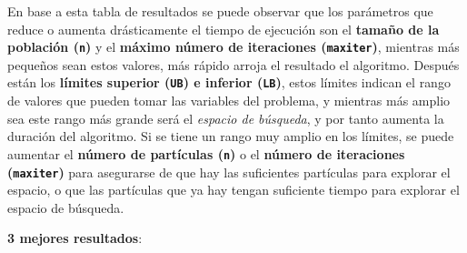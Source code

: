 \documentclass[12pt, a4paper]{article}
\begin{document}
        En base a esta tabla de resultados se puede observar que los parámetros que reduce o aumenta drásticamente el tiempo de ejecución son el \textbf{tamaño de la población (\lstinline{n})} y el \textbf{máximo número de iteraciones (\lstinline{maxiter})}, mientras más pequeños sean estos valores, más rápido arroja el resultado el algoritmo. Después están los \textbf{límites superior (\lstinline{UB}) e inferior (\lstinline{LB})}, estos límites indican el rango de valores que pueden tomar las variables del problema, y mientras más amplio sea este rango más grande será el \emph{espacio de búsqueda}, y por tanto aumenta la duración del algoritmo. Si se tiene un rango muy amplio en los límites, se puede aumentar el \textbf{número de partículas (\lstinline{n})} o el \textbf{número de iteraciones (\lstinline{maxiter})} para asegurarse de que hay las suficientes partículas para explorar el espacio, o que las partículas que ya hay tengan suficiente tiempo para explorar el espacio de búsqueda.

        \textbf{3 mejores resultados}:
\end{document}
